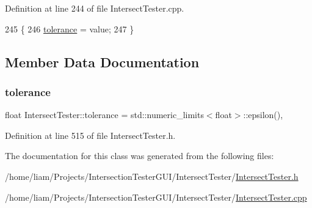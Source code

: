 Definition at line 244 of file Intersect\+Tester.\+cpp.


\begin{DoxyCode}
245 \{
246     \hyperlink{class_intersect_tester_a50c5d2e177394644ceee23c700a541fd}{tolerance} = value;
247 \}
\end{DoxyCode}


\subsection{Member Data Documentation}
\mbox{\label{class_intersect_tester_a50c5d2e177394644ceee23c700a541fd}} 
\subsubsection{\texorpdfstring{tolerance}{tolerance}}
{\footnotesize\ttfamily float Intersect\+Tester\+::tolerance = std\+::numeric\+\_\+limits$<$float$>$\+::epsilon()\hspace{0.3cm}{\ttfamily [static]}, {\ttfamily [private]}}



Definition at line 515 of file Intersect\+Tester.\+h.



The documentation for this class was generated from the following files\+:\begin{DoxyCompactItemize}
\item 
/home/liam/\+Projects/\+Intersection\+Tester\+G\+U\+I/\+Intersect\+Tester/\hyperlink{_intersect_tester_8h}{Intersect\+Tester.\+h}\item 
/home/liam/\+Projects/\+Intersection\+Tester\+G\+U\+I/\+Intersect\+Tester/\hyperlink{_intersect_tester_8cpp}{Intersect\+Tester.\+cpp}\end{DoxyCompactItemize}
